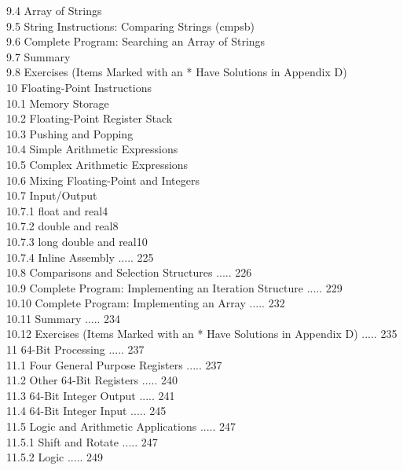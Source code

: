 \documentclass[10pt]{book}
\begin{document}
9.4 Array of Strings \\
9.5 String Instructions: Comparing Strings (cmpsb) \\
9.6 Complete Program: Searching an Array of Strings \\
9.7 Summary \\
9.8 Exercises (Items Marked with an * Have Solutions in Appendix D) \\
10 Floating-Point Instructions \\
10.1 Memory Storage \\
10.2 Floating-Point Register Stack \\
10.3 Pushing and Popping \\
10.4 Simple Arithmetic Expressions \\
10.5 Complex Arithmetic Expressions \\
10.6 Mixing Floating-Point and Integers \\
10.7 Input/Output \\
10.7.1 float and real4 \\
10.7.2 double and real8 \\
10.7.3 long double and real10 \\
10.7.4 Inline Assembly ..... 225\\
10.8 Comparisons and Selection Structures ..... 226\\
10.9 Complete Program: Implementing an Iteration Structure ..... 229\\
10.10 Complete Program: Implementing an Array ..... 232\\
10.11 Summary ..... 234\\
10.12 Exercises (Items Marked with an * Have Solutions in Appendix D) ..... 235\\
11 64-Bit Processing ..... 237\\
11.1 Four General Purpose Registers ..... 237\\
11.2 Other 64-Bit Registers ..... 240\\
11.3 64-Bit Integer Output ..... 241\\
11.4 64-Bit Integer Input ..... 245\\
11.5 Logic and Arithmetic Applications ..... 247\\
11.5.1 Shift and Rotate ..... 247\\
11.5.2 Logic ..... 249\\
\end{document}
